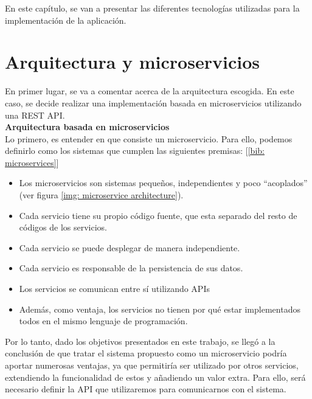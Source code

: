 \documentclass[a4paper, oneside, 12pt]{book}
\begin{document}
	\noindent En este capítulo, se van a presentar las diferentes tecnologías utilizadas para la implementación de la aplicación.
	
	\section{Arquitectura y microservicios}
	
	\noindent En primer lugar, se va a comentar acerca de la arquitectura escogida. En este caso, se decide realizar una implementación basada en microservicios utilizando una REST API. \\
	
	
	\noindent \textbf{\large Arquitectura basada en \textbf{microservicios}} \\
	
	\noindent Lo primero, es entender en que consiste un microservicio. Para ello, podemos definirlo como los sistemas que cumplen las siguientes premisas: [\ref{bib: microservices}]
	
	\begin{itemize}
		\item Los microservicios son sistemas pequeños, independientes y poco ``acoplados'' (ver figura \ref{img: microservice architecture}).
		
		\item Cada servicio tiene su propio código fuente, que esta separado del resto de códigos de los servicios.
		
		\item Cada servicio se puede desplegar de manera independiente. 
		
		\item Cada servicio es responsable de la persistencia de sus datos.
		
		\item Los servicios se comunican entre sí utilizando APIs
		
		\item Además, como ventaja, los servicios no tienen por qué estar implementados todos en el mismo lenguaje de programación.
	\end{itemize}

	\noindent Por lo tanto, dado los objetivos presentados en este trabajo, se llegó a la conclusión de que tratar el sistema propuesto como un microservicio podría aportar numerosas ventajas, ya que permitiría ser utilizado por otros servicios, extendiendo la funcionalidad de estos y añadiendo un valor extra. Para ello, será necesario definir la API que utilizaremos para comunicarnos con el sistema.
	
\end{document}
